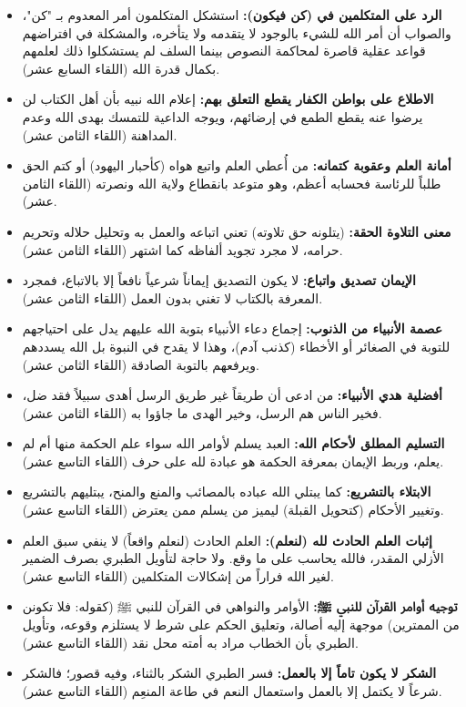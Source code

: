 \begin{itemize}
    \item \textbf{الرد على المتكلمين في (كن فيكون):} استشكل المتكلمون أمر المعدوم بـ "كن"، والصواب أن أمر الله للشيء بالوجود لا يتقدمه ولا يتأخره، والمشكلة في افتراضهم قواعد عقلية قاصرة لمحاكمة النصوص بينما السلف لم يستشكلوا ذلك لعلمهم بكمال قدرة الله (اللقاء السابع عشر).
    \item \textbf{الاطلاع على بواطن الكفار يقطع التعلق بهم:} إعلام الله نبيه بأن أهل الكتاب لن يرضوا عنه يقطع الطمع في إرضائهم، ويوجه الداعية للتمسك بهدى الله وعدم المداهنة (اللقاء الثامن عشر).
    \item \textbf{أمانة العلم وعقوبة كتمانه:} من أُعطي العلم واتبع هواه (كأحبار اليهود) أو كتم الحق طلباً للرئاسة فحسابه أعظم، وهو متوعد بانقطاع ولاية الله ونصرته (اللقاء الثامن عشر).
    \item \textbf{معنى التلاوة الحقة:} (يتلونه حق تلاوته) تعني اتباعه والعمل به وتحليل حلاله وتحريم حرامه، لا مجرد تجويد ألفاظه كما اشتهر (اللقاء الثامن عشر).
    \item \textbf{الإيمان تصديق واتباع:} لا يكون التصديق إيماناً شرعياً نافعاً إلا بالاتباع، فمجرد المعرفة بالكتاب لا تغني بدون العمل (اللقاء الثامن عشر).
    \item \textbf{عصمة الأنبياء من الذنوب:} إجماع دعاء الأنبياء بتوبة الله عليهم يدل على احتياجهم للتوبة في الصغائر أو الأخطاء (كذنب آدم)، وهذا لا يقدح في النبوة بل الله يسددهم ويرفعهم بالتوبة الصادقة (اللقاء الثامن عشر).
    \item \textbf{أفضلية هدي الأنبياء:} من ادعى أن طريقاً غير طريق الرسل أهدى سبيلاً فقد ضل، فخير الناس هم الرسل، وخير الهدى ما جاؤوا به (اللقاء الثامن عشر).
    \item \textbf{التسليم المطلق لأحكام الله:} العبد يسلم لأوامر الله سواء علم الحكمة منها أم لم يعلم، وربط الإيمان بمعرفة الحكمة هو عبادة لله على حرف (اللقاء التاسع عشر).
    \item \textbf{الابتلاء بالتشريع:} كما يبتلي الله عباده بالمصائب والمنع والمنح، يبتليهم بالتشريع وتغيير الأحكام (كتحويل القبلة) ليميز من يسلم ممن يعترض (اللقاء التاسع عشر).
    \item \textbf{إثبات العلم الحادث لله (لنعلم):} العلم الحادث (لنعلم واقعاً) لا ينفي سبق العلم الأزلي المقدر، فالله يحاسب على ما وقع. ولا حاجة لتأويل الطبري بصرف الضمير لغير الله فراراً من إشكالات المتكلمين (اللقاء التاسع عشر).
    \item \textbf{توجيه أوامر القرآن للنبي ﷺ:} الأوامر والنواهي في القرآن للنبي ﷺ (كقوله: فلا تكونن من الممترين) موجهة إليه أصالة، وتعليق الحكم على شرط لا يستلزم وقوعه، وتأويل الطبري بأن الخطاب مراد به أمته محل نقد (اللقاء التاسع عشر).
    \item \textbf{الشكر لا يكون تاماً إلا بالعمل:} فسر الطبري الشكر بالثناء، وفيه قصور؛ فالشكر شرعاً لا يكتمل إلا بالعمل واستعمال النعم في طاعة المنعِم (اللقاء التاسع عشر).

\end{itemize}
